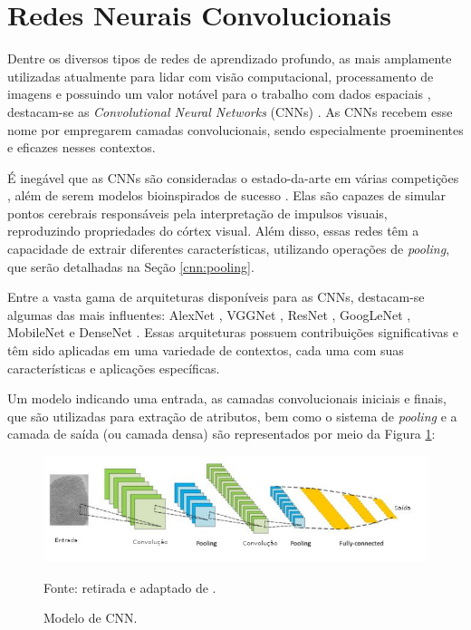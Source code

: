 \newpage
\clearpage

\section{Redes Neurais Convolucionais}
\label{cnn}

Dentre os diversos tipos de redes de aprendizado profundo, as mais amplamente utilizadas atualmente para lidar com visão computacional, processamento de imagens e possuindo um valor notável para o trabalho com dados espaciais \citep{Goodfellow2016, ponti2018funciona, Ghosh2019}, destacam-se as \textit{Convolutional Neural Networks} (CNNs) \citep{LeCun1999}. As CNNs recebem esse nome por empregarem camadas convolucionais, sendo especialmente proeminentes e eficazes nesses contextos.

É inegável que as CNNs são consideradas o estado-da-arte em várias competições \citep{Parkhi2015}, além de serem modelos bioinspirados de sucesso \citep{Goodfellow2016}. Elas são capazes de simular pontos cerebrais responsáveis pela interpretação de impulsos visuais, reproduzindo propriedades do córtex visual. Além disso, essas redes têm a capacidade de extrair diferentes características, utilizando operações de \textit{pooling}, que serão detalhadas na Seção \ref{cnn:pooling}.

Entre a vasta gama de arquiteturas disponíveis para as CNNs, destacam-se algumas das mais influentes: AlexNet \citep{krizhevsky2012imagenet}, VGGNet \citep{Simonyan2015}, ResNet \citep{He2016}, GoogLeNet \citep{Szegedy2015}, MobileNet \citep{Howard2017} e DenseNet \citep{Huang2017}. Essas arquiteturas possuem contribuições significativas e têm sido aplicadas em uma variedade de contextos, cada uma com suas características e aplicações específicas.

Um modelo indicando uma entrada, as camadas convolucionais iniciais e finais, que são utilizadas para extração de atributos, bem como o sistema de \textit{pooling} e a camada de saída (ou camada densa) são representados por meio da Figura \ref{cnn:fig:10}:

\begin{figure}[H]
    \centering
    \caption{Modelo de CNN.}
    \includegraphics[width=1\linewidth]{recursos/imagens/deep/cnn.jpg}
    \label{cnn:fig:10}

    Fonte: retirada e adaptado de \cite{Minaee2021DeepClassification}.
\end{figure}

